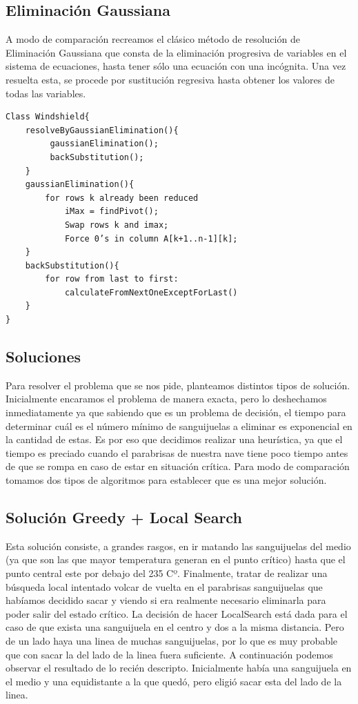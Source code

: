 \newpage

\subsection{Eliminación Gaussiana}
 A modo de comparación recreamos el clásico método de resolución de Eliminación Gaussiana que consta de la eliminación progresiva de variables en el sistema de ecuaciones, hasta tener sólo una ecuación con una incógnita. Una vez resuelta esta, se procede por sustitución regresiva hasta obtener los valores de todas las variables.

\begin{verbatim}
Class Windshield{
    resolveByGaussianElimination(){
         gaussianElimination();
         backSubstitution();
    } 
    gaussianElimination(){
        for rows k already been reduced
            iMax = findPivot();
            Swap rows k and imax;
            Force 0’s in column A[k+1..n-1][k];
    }
    backSubstitution(){
        for row from last to first:
            calculateFromNextOneExceptForLast()
    }
}
\end{verbatim}



\subsection{Soluciones}

Para resolver el problema que se nos pide, planteamos distintos tipos de solución. Inicialmente encaramos el problema de manera exacta, pero lo deshechamos inmediatamente ya que sabiendo que es un problema de decisión, el tiempo para determinar cuál es el número mínimo de sanguijuelas a eliminar es exponencial en la cantidad de estas. Es por eso que decidimos realizar una heurística, ya que el tiempo es preciado cuando el parabrisas de nuestra nave tiene poco tiempo antes de que se rompa en caso de estar en situación crítica. Para modo de comparación tomamos dos tipos de algoritmos para establecer que es una mejor solución.


\subsection{Solución Greedy + Local Search}
Esta solución consiste, a grandes rasgos, en ir matando las sanguijuelas del medio (ya que son las que mayor temperatura generan en el punto crítico) hasta que el punto central este por debajo del 235 Cº. Finalmente, tratar de realizar una búsqueda local intentado volcar de vuelta en el parabrisas sanguijuelas que habíamos decidido sacar y viendo si era realmente necesario eliminarla para poder salir del estado crítico. La decisión de hacer LocalSearch está dada para el caso de que exista una sanguijuela en el centro y dos a la misma distancia. Pero de un lado haya una linea de muchas sanguijuelas, por lo que es muy probable que con sacar la del lado de la linea fuera suficiente. A continuación podemos observar el resultado de lo recién descripto. Inicialmente había una sanguijuela en el medio y una equidistante a la que quedó, pero eligió sacar esta del lado de la linea.

